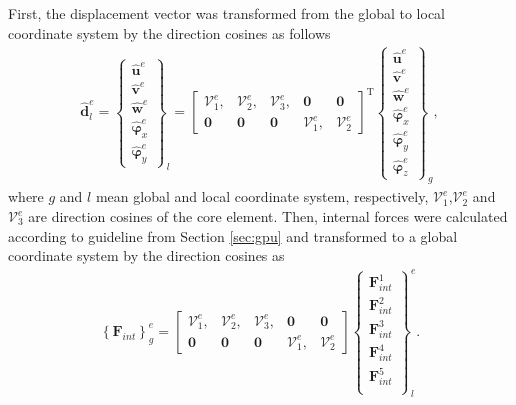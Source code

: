 \documentclass[11pt,a4paper,final]{report}
\theoremstyle{plain}
\begin{document}
First, the displacement vector was transformed from the global to local coordinate system by the direction cosines as follows
\begin{eqnarray}
	\widehat{\textbf{d}}^e_l = \left \{\begin{array}{c}
		\widehat{\textbf{u}}^e \\ \widehat{\textbf{v}}^e \\
		\widehat{\textbf{w}}^e \\ \widehat{\boldsymbol{\varphi}}_x^e \\
		\widehat{\boldsymbol{\varphi}}_y^e
	\end{array}\right \}_l = 
	\left [\begin{array}{ccccc}
		\mathcal{V}^e_1, & \mathcal{V}^e_2, & \mathcal{V}^e_3, & \textbf{0} & \textbf{0} \\
		\textbf{0} & \textbf{0} & \textbf{0} & \mathcal{V}^e_1, & \mathcal{V}^e_2
	\end{array}\right ]^{\mathrm{T}}
	\left \{\begin{array}{c}
		\widehat{\textbf{u}}^e \\ \widehat{\textbf{v}}^e \\
		\widehat{\textbf{w}}^e \\ \widehat{\boldsymbol{\varphi}}_x^e \\
		\widehat{\boldsymbol{\varphi}}_y^e\\
		\widehat{\boldsymbol{\varphi}}_z^e
	\end{array}\right \}_g,
	\label{eq:d_local}
\end{eqnarray}
where \(g\) and \(l\) mean global and local coordinate system, respectively, \(\mathcal{V}^e_1\),\(\mathcal{V}^e_2\) and \(\mathcal{V}^e_3\) are direction cosines of the core element.
Then, internal forces were calculated according to guideline from Section \ref{sec:gpu} and transformed to a global coordinate system by the direction cosines as
\begin{eqnarray}
	\left\{\textbf{F}_{int}\right\}^e_g =
	\left [\begin{array}{ccccc}
		\mathcal{V}^e_1, & \mathcal{V}^e_2, & \mathcal{V}^e_3, & \textbf{0} & \textbf{0} \\
		\textbf{0} & \textbf{0} & \textbf{0} & \mathcal{V}^e_1, & \mathcal{V}^e_2
	\end{array}\right ]
	\left \{\begin{array}{c}
		\textbf{F}^1_{int} \\
		\textbf{F}^2_{int} \\
		\textbf{F}^3_{int} \\
		\textbf{F}^4_{int} \\
		\textbf{F}^5_{int} \\
	\end{array}\right \}_l^e.
	\label{eq:f_global}
\end{eqnarray}
\end{document}
